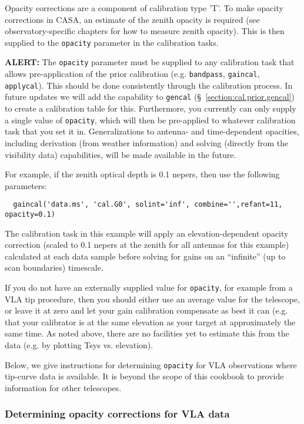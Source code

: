 Opacity corrections are a component of calibration type 'T'.  To make
opacity corrections in CASA, an estimate of the zenith opacity is
required (see observatory-specific chapters for how to measure zenith
opacity).  This is then supplied to the {\tt opacity} parameter in
the calibration tasks.

{\bf ALERT:} The {\tt opacity} parameter must be supplied
to any calibration task that allows pre-application of the prior
calibration (e.g. {\tt bandpass}, {\tt gaincal}, {\tt applycal}).
This should be done consistently through the calibration process.
In future updates we will add the capability to {\tt gencal}
(\S~\ref{section:cal.prior.gencal}) to create a calibration table for this.
Furthermore, you currently can only supply a single value
of {\tt opacity}, which will then be pre-applied to whatever 
calibration task that you set it in.
Generalizations to antenna- and time-dependent opacities, including
derivation (from weather information) and solving (directly from the
visibility data) capabilities, will be made available in the future.

For example, if the zenith optical depth is 0.1 nepers, then
use the following parameters:
\small
\begin{verbatim}
  gaincal('data.ms', 'cal.G0', solint='inf', combine='',refant=11, opacity=0.1)
\end{verbatim}
\normalsize
The calibration task in this example will apply an
elevation-dependent opacity correction (scaled to 0.1 nepers at the
zenith for all antennas for this example) calculated at each 
data sample before solving for gains on an ``infinite'' (up to scan
boundaries) timescale. 

If you do not have an externally supplied value for {\tt opacity}, for
example from a VLA tip procedure, then you should either use an
average value for the telescope, or leave it at zero and let
your gain calibration compensate as best it can (e.g. that your 
calibrator is at the same elevation as your target at approximately 
the same time.
As noted above, there are no facilities yet to estimate this from the
data (e.g. by plotting Tsys vs. elevation).

Below, we give instructions for determining {\tt opacity} for VLA 
observations where tip-curve data is available.  It is beyond the
scope of this cookbook to provide information for other telescopes.

\subsubsection{Determining opacity corrections for VLA data}
\label{section:cal.prior.opacity.vla}

